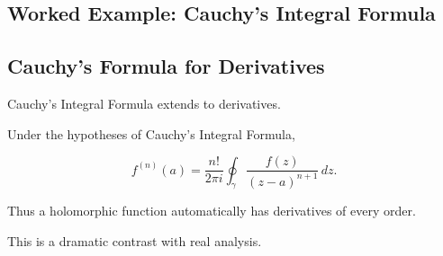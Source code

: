 \subsection{Worked Example: Cauchy's Integral Formula}
\label{subsec:worked-cauchy-formula}


\subsection{Cauchy's Formula for Derivatives}
\label{subsec:cauchy-derivative-formula}

Cauchy's Integral Formula extends to derivatives.

\begin{theorem}
Under the hypotheses of Cauchy's Integral Formula,

\[
\boxed{
f^{(n)}(a)
=
\frac{n!}{2\pi i}
\oint_\gamma
\frac{f(z)}
{(z-a)^{n+1}}
\,dz.
}
\]
\end{theorem}

Thus a holomorphic function automatically has derivatives of every order.

This is a dramatic contrast with real analysis.

